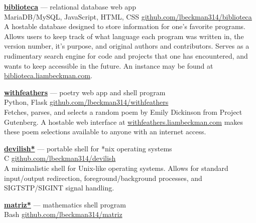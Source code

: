 \documentclass[a4paper]{article}
\begin{document}
\textcolor{my-grey}{\dotfill}
\medbreak

\textcolor{my-blue}{\textbf{\href{https://biblioteca.liambeckman.com}{biblioteca}}} --- relational database web app\\
\textcolor{my-grey}{MariaDB/MySQL, JavaScript, HTML, CSS \hfill \href{https://github.com/lbeckman314/biblioteca}{github.com/lbeckman314/biblioteca}}\\

A hostable database designed to store information for one's favorite programs. Allows users to keep track of what language each program was written in, the version number, it’s purpose, and original authors and contributors. Serves as a rudimentary search engine for code and projects that one has encountered, and wants to keep accessible in the future. An instance may be found at \textcolor{my-blue}{\href{https://biblioteca.liambeckman.com}{biblioteca.liambeckman.com}}.

\textcolor{my-grey}{\dotfill}
\medbreak

\textcolor{my-blue}{\textbf{\href{https://withfeathers.liambeckman.com}{withfeathers}}} --- poetry web app and shell program\\
\textcolor{my-grey}{Python, Flask \hfill \href{https://github.com/lbeckman314/withfeathers}{github.com/lbeckman314/withfeathers}}\\

Fetches, parses, and selects a random poem by Emily Dickinson from Project Gutenberg. A hostable web interface at \textcolor{my-blue}{\href{https://withfeathers.liambeckman.com}{withfeathers.liambeckman.com}} makes these poem selections available to anyone with an internet access.

\textcolor{my-grey}{\dotfill}
\medbreak

\textcolor{my-blue}{\textbf{\href{https://liambeckman.com/code/devilish}{devilish*}}} --- portable shell for *nix operating systems\\
\textcolor{my-grey}{C \hfill \href{https://github.com/lbeckman314/devilish}{github.com/lbeckman314/devilish}}\\

A minimalistic shell for Unix-like operating systems. Allows for standard input/output redirection, foreground/background processes, and SIGTSTP/SIGINT signal handling. 

\textcolor{my-grey}{\dotfill}
\medbreak

\textcolor{my-blue}{\textbf{\href{https://liambeckman.com/code/matriz}{matriz*}}} --- mathematics shell program\\
\textcolor{my-grey}{Bash \hfill \href{https://github.com/lbeckman314/matriz}{github.com/lbeckman314/matriz}}\\
\end{document}
